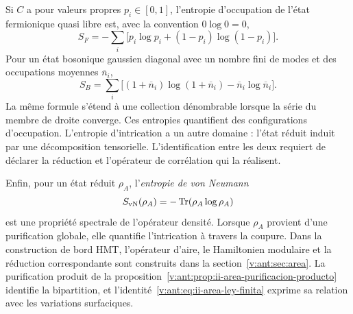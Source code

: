 Si \(C\) a pour valeurs propres \(p_i\in[0,1]\), l’entropie d’occupation de
l’état fermionique quasi libre est, avec la convention \(0\log0=0\),
\begin{equation}
 S_F=-\sum_i\bigl[p_i\log p_i+(1-p_i)\log(1-p_i)\bigr].
 \label{v:rec:eq:entropia-cuasilibre-fermi-rev3}
\end{equation}
Pour un état bosonique gaussien diagonal avec un nombre fini de modes et
des occupations moyennes \(\overline n_i\),
\begin{equation}
 S_B=\sum_i\bigl[(1+\overline n_i)\log(1+\overline n_i)
                  -\overline n_i\log\overline n_i\bigr].
 \label{v:rec:eq:entropia-gaussiana-bose-rev3}
\end{equation}
La même formule s’étend à une collection dénombrable lorsque la série du
membre de droite converge.
Ces entropies quantifient des configurations d’occupation. L’entropie
d’intrication a un autre domaine : l’état réduit induit par une
décomposition tensorielle. L’identification entre les deux requiert de déclarer la
réduction et l’opérateur de corrélation qui la réalisent.

Enfin, pour un état réduit \(\rho_A\), l’\emph{entropie de von
Neumann}
\[
 S_{\rm vN}(\rho_A)=-\operatorname{Tr}(\rho_A\log\rho_A)
\]
est une propriété spectrale de l’opérateur densité. Lorsque \(\rho_A\)
provient d’une purification globale, elle quantifie l’intrication à travers
la coupure. Dans la construction de bord HMT, l’opérateur d’aire, le
Hamiltonien modulaire et la réduction correspondante sont construits dans la
section~\ref{v:ant:sec:area}. La purification produit de la
proposition~\ref{v:ant:prop:ii-area-purificacion-producto} identifie
la bipartition, et l’identité~\eqref{v:ant:eq:ii-area-ley-finita}
exprime sa relation avec les variations surfaciques.

